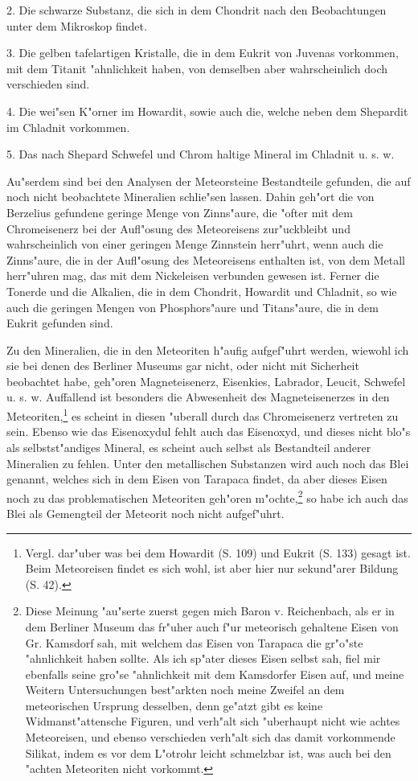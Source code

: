 \documentclass[a4paper, 11pt, oneside, german]{article}
\begin{document}
2. Die schwarze Substanz, die sich in dem Chondrit nach den Beobachtungen unter dem Mikroskop findet.

3. Die gelben tafelartigen Kristalle, die in dem Eukrit von Juvenas vorkommen, mit dem Titanit "ahnlichkeit haben, von demselben aber wahrscheinlich doch verschieden sind.

4. Die wei"sen K"orner im Howardit, sowie auch die, welche neben dem Shepardit im Chladnit vorkommen.

5. Das nach Shepard Schwefel und Chrom haltige Mineral im Chladnit u. s. w.

Au"serdem sind bei den Analysen der Meteorsteine Bestandteile gefunden, die auf noch nicht beobachtete Mineralien schlie"sen lassen. Dahin geh"ort die von Berzelius gefundene geringe Menge von Zinns"aure, die "ofter mit dem Chromeisenerz bei der Aufl"osung des Meteoreisens zur"uckbleibt und wahrscheinlich von einer geringen Menge Zinnstein herr"uhrt, wenn auch die Zinns"aure, die in der Aufl"osung des Meteoreisens enthalten ist, von dem Metall herr"uhren mag, das mit dem Nickeleisen verbunden gewesen ist. Ferner die Tonerde und die Alkalien, die in dem Chondrit, Howardit und Chladnit, so wie auch die geringen Mengen von Phosphors"aure und Titans"aure, die in dem Eukrit gefunden sind.

Zu den Mineralien, die in den Meteoriten h"aufig aufgef"uhrt werden, wiewohl ich sie bei denen des Berliner Museums gar nicht, oder nicht mit Sicherheit beobachtet habe, geh"oren Magneteisenerz, Eisenkies, Labrador, Leucit, Schwefel u. s. w. Auffallend ist besonders die Abwesenheit des Magneteisenerzes in den Meteoriten,\footnote{Vergl. dar"uber was bei dem Howardit (S. 109) und Eukrit (S. 133) gesagt ist. Beim Meteoreisen findet es sich wohl, ist aber hier nur sekund"arer Bildung (S. 42).} es scheint in diesen "uberall durch das Chromeisenerz vertreten zu sein. Ebenso wie das Eisenoxydul fehlt auch das Eisenoxyd, und dieses nicht blo"s als selbstst"andiges Mineral, es scheint auch selbst als Bestandteil anderer Mineralien zu fehlen. Unter den metallischen Substanzen wird auch noch das Blei genannt, welches sich in dem Eisen von Tarapaca findet, da aber dieses Eisen noch zu das problematischen Meteoriten geh"oren m"ochte,\footnote{Diese Meinung "au"serte zuerst gegen mich Baron v. Reichenbach, als er in dem Berliner Museum das fr"uher auch f"ur meteorisch gehaltene Eisen von Gr. Kamsdorf sah, mit welchem das Eisen von Tarapaca die gr"o"ste "ahnlichkeit haben sollte. Als ich sp"ater dieses Eisen selbst sah, fiel mir ebenfalls seine gro"se "ahnlichkeit mit dem Kamsdorfer Eisen auf, und meine Weitern Untersuchungen best"arkten noch meine Zweifel an dem meteorischen Ursprung desselben, denn ge"atzt gibt es keine Widmanst"attensche Figuren, und verh"alt sich "uberhaupt nicht wie achtes Meteoreisen, und ebenso verschieden verh"alt sich das damit vorkommende Silikat, indem es vor dem L"otrohr leicht schmelzbar ist, was auch bei den "achten Meteoriten nicht vorkommt.} so habe ich auch das Blei als Gemengteil der Meteorit noch nicht aufgef"uhrt.
\end{document}
